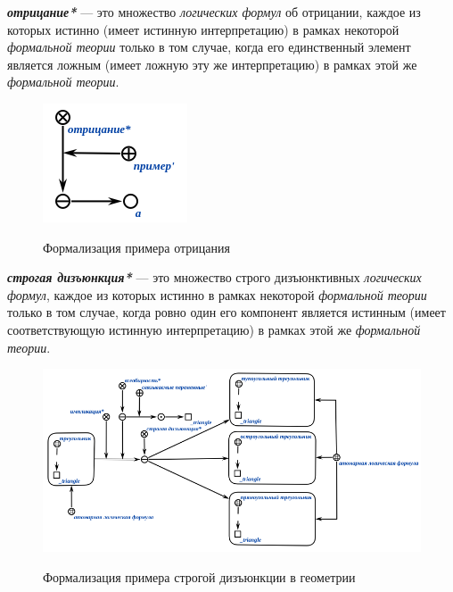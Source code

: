 \begin{SCn}
\end{SCn}

\textbf{\textit{отрицание*}} --- это множество \textit{логических формул} об отрицании, каждое из которых истинно (имеет истинную интерпретацию) в рамках некоторой \textit{формальной теории} только в том случае, когда его единственный элемент является ложным (имеет ложную эту же интерпретацию) в рамках этой же \textit{формальной теории}.

\begin{figure}[H]
	\caption{Формализация примера отрицания}
	\includegraphics[scale=0.8]{author/part2/figures/logic/negation.png}
	\label{fig:negation}
\end{figure}

\begin{SCn}
\end{SCn}

\textbf{\textit{строгая дизъюнкция*}} --- это множество строго дизъюнктивных \textit{логических формул}, каждое из которых истинно в рамках некоторой \textit{формальной теории} только в том случае, когда ровно один его компонент является истинным (имеет соответствующую истинную интерпретацию) в рамках этой же \textit{формальной теории}.

\begin{figure}[H]
	\caption{Формализация примера строгой дизъюнкции в геометрии}
	\includegraphics[scale=0.8]{author/part2/figures/logic/strict_disjunction_triangle.png}
	\label{fig:strict_disjunction_triangle}
\end{figure}

